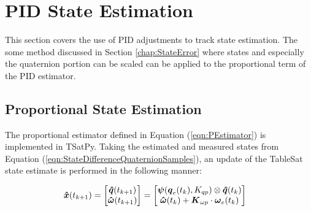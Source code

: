 \section{PID State Estimation}
\label{sec:BodyRatePIDEstimation}

This section covers the use of PID adjustments to track state estimation.  The some method discussed in Section \ref{chap:StateError} where states and especially the quaternion portion can be scaled can be applied to the proportional term of the PID estimator.

\subsection{Proportional State Estimation}
\label{subsec:ProportionalEstimator}

The proportional estimator defined in Equation (\ref{eqn:PEstimator}) is implemented in TSatPy.  Taking the estimated and measured states from Equation (\ref{eqn:StateDifferenceQuaternionSamples}), an update of the TableSat state estimate is performed in the following manner:

\begin{equation}
  \begin{aligned}
    \boldsymbol{\hat{x}}(t_{k+1}) &= \begin{bmatrix} \boldsymbol{\hat{q}}(t_{k+1}) \\ \boldsymbol{\hat{\omega}}(t_{k+1}) \end{bmatrix} = \begin{bmatrix} \boldsymbol{\psi}(\boldsymbol{q}_e(t_{k}), K_{qp}) \otimes \boldsymbol{\hat{q}}(t_{k}) \\  \boldsymbol{\hat{\omega}}(t_{k}) + \boldsymbol{K}_{\omega p} \cdot \boldsymbol{\omega}_e(t_{k}) \end{bmatrix}
  \end{aligned}
  \label{eqn:PEstimator}
\end{equation}

